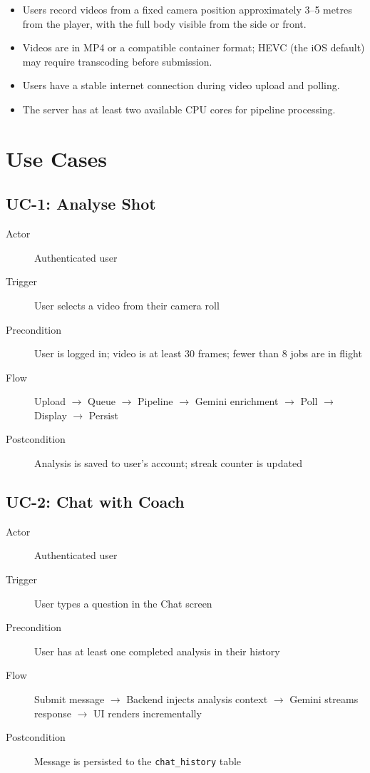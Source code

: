 \begin{itemize}
  \item Users record videos from a fixed camera position approximately 3--5 metres from the player, with the full body visible from the side or front.
  \item Videos are in MP4 or a compatible container format; HEVC (the iOS default) may require transcoding before submission.
  \item Users have a stable internet connection during video upload and polling.
  \item The server has at least two available CPU cores for pipeline processing.
\end{itemize}

\section{Use Cases}
\label{sec:use_cases}

\subsection{UC-1: Analyse Shot}

\begin{description}
  \item[Actor] Authenticated user
  \item[Trigger] User selects a video from their camera roll
  \item[Precondition] User is logged in; video is at least 30 frames; fewer than 8 jobs are in flight
  \item[Flow] Upload $\rightarrow$ Queue $\rightarrow$ Pipeline $\rightarrow$ Gemini enrichment $\rightarrow$ Poll $\rightarrow$ Display $\rightarrow$ Persist
  \item[Postcondition] Analysis is saved to user's account; streak counter is updated
\end{description}

\subsection{UC-2: Chat with Coach}

\begin{description}
  \item[Actor] Authenticated user
  \item[Trigger] User types a question in the Chat screen
  \item[Precondition] User has at least one completed analysis in their history
  \item[Flow] Submit message $\rightarrow$ Backend injects analysis context $\rightarrow$ Gemini streams response $\rightarrow$ UI renders incrementally
  \item[Postcondition] Message is persisted to the \lstinline|chat_history| table
\end{description}

